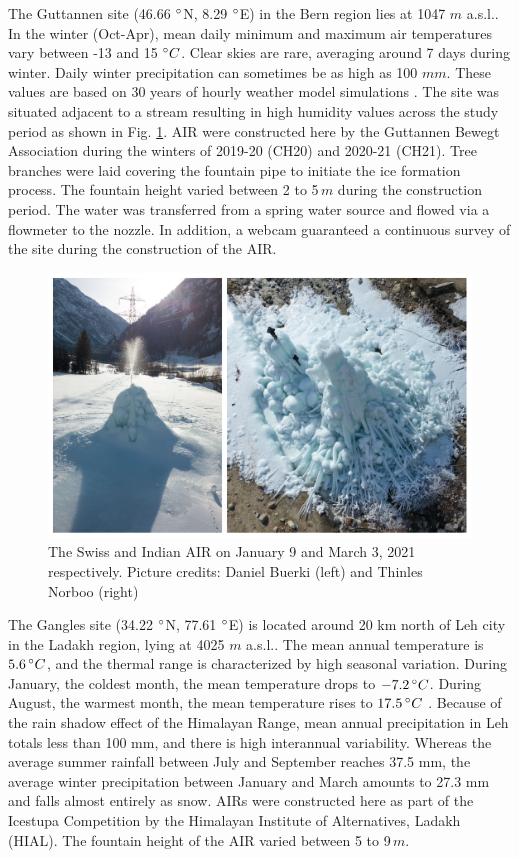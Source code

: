 \documentclass[utf8]{frontiersSCNS}
\begin{document}
The Guttannen site (46.66 $\degree$N, 8.29 $\degree$E) in the Bern region lies at 1047 $m$ a.s.l.. In the winter
(Oct-Apr), mean daily minimum and maximum air temperatures vary between -13 and 15 $\degree C$. Clear skies are
rare, averaging around 7 days during winter. Daily winter precipitation can sometimes be as high as 100 $mm$.
These values are based on 30 years of hourly weather model simulations \citep{guttannen}. The site was situated
adjacent to a stream resulting in high humidity values across the study period as shown in Fig. \ref{fig:2AIR}.
AIR were constructed here by the Guttannen Bewegt Association during the winters of 2019-20 (CH20) and 2020-21
(CH21). Tree branches were laid covering the fountain pipe to initiate the ice formation process. The fountain
height varied between 2 to 5\,$m$ during the construction period. The water was transferred from a spring water
source and flowed via a flowmeter to the nozzle. In addition, a webcam guaranteed a continuous survey of the
site during the construction of the AIR.

\begin{figure}
	\begin{center}
		\includegraphics[width=12 cm]{Figures/Figure_2.jpg}
	\end{center}
	\caption{The Swiss and Indian AIR on January 9 and March 3, 2021 respectively. Picture credits: Daniel Buerki (left)
		and Thinles Norboo (right)}
	\label{fig:2AIR}
\end{figure}

The Gangles site (34.22 $\degree$N, 77.61 $\degree$E) is located around 20 km north of Leh city in the Ladakh
region, lying at 4025 $m$ a.s.l.. The mean annual temperature is $5.6 \, \degree C$, and the thermal range is
characterized by high seasonal variation. During January, the coldest month, the mean temperature drops to $-7.2
\, \degree C$. During August, the warmest month, the mean temperature rises to $17.5 \, \degree C$
\citep{Nusser_2012}. Because of the rain shadow effect of the Himalayan Range, mean annual precipitation in Leh
totals less than 100 mm, and there is high interannual variability. Whereas the average summer rainfall between
July and September reaches 37.5 mm, the average winter precipitation between January and March amounts to 27.3
mm and falls almost entirely as snow.  AIRs were constructed here as part of the Icestupa Competition  by the
Himalayan Institute of Alternatives, Ladakh (HIAL). The fountain height of the AIR varied between 5 to 9\,$m$.
\end{document}
